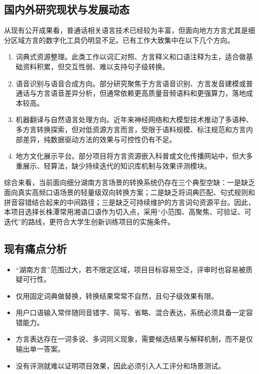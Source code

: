 \documentclass[12pt,a4paper]{ctexart}
\begin{document}
\subsection{国内外研究现状与发展动态}

从现有公开成果看，普通话相关语言技术已经较为丰富，但面向地方方言尤其是细分区域方言的数字化工具仍明显不足。已有工作大致集中在以下几个方向。

\begin{enumerate}
  \item 词典式资源整理。此类工作以词汇对照、方言释义和口语注释为主，适合做基础资料积累，但交互性弱、难以支持句子级转换。
  \item 语音识别与语音合成方向。部分研究聚焦于方言语音识别、方言发音建模或普通话与方言语音差异分析，但通常依赖更高质量音频语料和更强算力，落地成本较高。
  \item 机器翻译与自然语言处理方向。近年来神经网络和大模型技术推动了多语种、多方言转换探索，但对低资源方言而言，受限于语料规模、标注规范和方言内部差异，纯数据驱动方法的效果与可控性仍有不足。
  \item 地方文化展示平台。部分项目将方言资源嵌入科普或文化传播网站中，但大多重展示、轻算法，缺少持续迭代的知识库机制与效果评测模块。
\end{enumerate}

综合来看，当前面向细分湖南方言场景的转换系统仍存在三个典型空缺：一是缺乏面向真实高频口语场景的轻量级双向转换方案；二是缺乏将词典匹配、句式规则和拼音容错结合起来的中间路径；三是缺乏可持续维护的方言词句资源平台。因此，本项目选择长株潭常用湘语口语作为切入点，采用“小范围、高聚焦、可验证、可迭代”的路线，更符合大学生创新训练项目的实施条件。

\subsection{现有痛点分析}

\begin{itemize}
  \item “湖南方言”范围过大，若不限定区域，项目目标容易空泛，评审时也容易被质疑可行性。
  \item 仅用固定词典做替换，转换结果常常不自然，且句子级效果有限。
  \item 用户口语输入常伴随同音错字、简写、省略、混合表达，系统必须具备一定容错能力。
  \item 方言表达存在一词多说、多词同义现象，需要候选结果与解释机制，而不是仅输出单一答案。
  \item 没有评测就难以证明项目效果，因此必须引入人工评分和场景测试。
\end{itemize}
\end{document}
